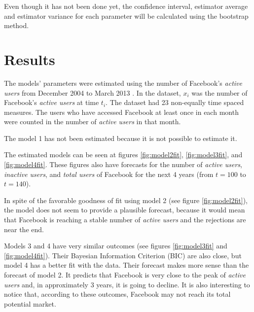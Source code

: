 Even though it has not been done yet, the confidence interval, estimator average and estimator variance for each parameter will be calculated using the bootstrap method.



\chapter{Results}

The models' parameters were estimated using the number of Facebook's \textit{active users} from December 2004 to March 2013 \citep{facebookdata}. In the dataset, $x_i$ was the number of Facebook's \textit{active users} at time $t_i$. The dataset had 23 non-equally time spaced measures. The users who have accessed Facebook at least once in each month were counted in the number of \textit{active users} in that month.

The model 1 has not been estimated because it is not possible to estimate it.


The estimated models can be seen at figures \ref{fig:model2fit}, \ref{fig:model3fit}, and \ref{fig:model4fit}. These figures also have forecasts for the number of \textit{active users}, \textit{inactive users}, and \textit{total users} of Facebook for the next 4 years (from $t=100$ to $t=140$).

In spite of the favorable goodness of fit using model 2 (see figure \ref{fig:model2fit}), the model does not seem to provide a plausible forecast, because it would mean that Facebook is reaching a stable number of \textit{active users} and the rejections are near the end.

Models 3 and 4 have very similar outcomes (see figures \ref{fig:model3fit} and \ref{fig:model4fit}). Their Bayesian Information Criterion (BIC) are also close, but model 4 has a better fit with the data. Their forecast makes more sense than the forecast of model 2. It predicts that Facebook is very close to the peak of \textit{active users} and, in approximately 3 years, it is going to decline. It is also interesting to notice that, according to these outcomes, Facebook may not reach its total potential market.

